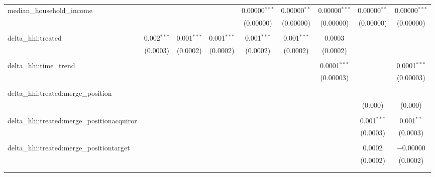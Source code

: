 \begin{table}[H]
{\begin{tabular}{@{\extracolsep{5pt}}lcccccccc}
  median\_household\_income &  &  &  & 0.00000$^{***}$ & 0.00000$^{**}$ & 0.00000$^{***}$ & 0.00000$^{**}$ & 0.00000$^{***}$ \\  

   &  &  &  & (0.00000) & (0.00000) & (0.00000) & (0.00000) & (0.00000) \\  

   & & & & & & & & \\  

  delta\_hhi:treated & 0.002$^{***}$ & 0.001$^{***}$ & 0.001$^{***}$ & 0.001$^{***}$ & 0.001$^{***}$ & 0.0003 &  &  \\  

   & (0.0003) & (0.0002) & (0.0002) & (0.0002) & (0.0002) & (0.0002) &  &  \\  

   & & & & & & & & \\  

  delta\_hhi:time\_trend &  &  &  &  &  & 0.0001$^{***}$ &  & 0.0001$^{***}$ \\  

   &  &  &  &  &  & (0.00003) &  & (0.00003) \\  

   & & & & & & & & \\  

  delta\_hhi:treated:merge\_position &  &  &  &  &  &  &  &  \\  

   &  &  &  &  &  &  & (0.000) & (0.000) \\  

   & & & & & & & & \\  

  delta\_hhi:treated:merge\_positionacquiror &  &  &  &  &  &  & 0.001$^{***}$ & 0.001$^{**}$ \\  

   &  &  &  &  &  &  & (0.0003) & (0.0003) \\  

   & & & & & & & & \\  

  delta\_hhi:treated:merge\_positiontarget &  &  &  &  &  &  & 0.0002 & $-$0.00000 \\  

   &  &  &  &  &  &  & (0.0002) & (0.0002) \\  

   & & & & & & & & \\  

 \hline \\[-1.8ex]  


\end{tabular}}
\end{table}
